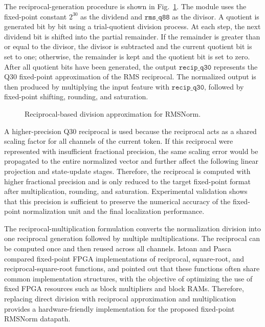 \documentclass[11pt,twoside]{eitExjobb}
\begin{document}
The reciprocal-generation procedure is shown in Fig.~\ref{fig:rms_reciprocal_flow}.
The module uses the fixed-point constant \(2^{30}\) as the dividend and
\(\texttt{rms\_q88}\) as the divisor. A quotient is generated bit by bit using a
trial-quotient division process. At each step, the next dividend bit is shifted into
the partial remainder. If the remainder is greater than or equal to the divisor, the
divisor is subtracted and the current quotient bit is set to one; otherwise, the
remainder is kept and the quotient bit is set to zero. After all quotient bits have
been generated, the output \(\texttt{recip\_q30}\) represents the Q30 fixed-point
approximation of the RMS reciprocal. The normalized output is then produced by
multiplying the input feature with \(\texttt{recip\_q30}\), followed by fixed-point
shifting, rounding, and saturation.

\begin{figure}[H]
  \centering
  
  \caption{Reciprocal-based division approximation for RMSNorm.}
  \label{fig:rms_reciprocal_flow}
\end{figure}

A higher-precision Q30 reciprocal is used because the reciprocal acts as a shared
scaling factor for all channels of the current token. If this reciprocal were
represented with insufficient fractional precision, the same scaling error would be
propagated to the entire normalized vector and further affect the following linear
projection and state-update stages. Therefore, the reciprocal is computed with higher
fractional precision and is only reduced to the target fixed-point format after
multiplication, rounding, and saturation. Experimental validation shows that this
precision is sufficient to preserve the numerical accuracy of the fixed-point
normalization unit and the final localization performance.

The reciprocal-multiplication formulation converts the normalization division into one
reciprocal generation followed by multiple multiplications. The reciprocal can be 
computed once and then reused across all channels. Istoan and Pasca compared fixed-point 
FPGA implementations of reciprocal, square-root, and reciprocal-square-root functions, 
and pointed out that these functions often share common implementation structures, with 
the objective of optimizing the use of fixed FPGA resources such as block multipliers 
and block RAMs\cite{cite:Istoan2015ReciprocalSqrt}. Therefore, replacing direct division with
reciprocal approximation and multiplication provides a hardware-friendly implementation
for the proposed fixed-point RMSNorm datapath.
\end{document}
